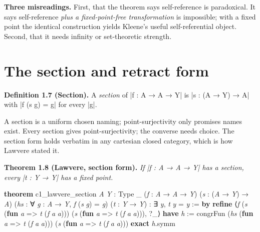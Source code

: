 \documentclass{memoir}
\begin{document}
\textbf{Three misreadings.} First, that the theorem says self-reference is paradoxical.
It says self-reference \emph{plus a fixed-point-free transformation} is impossible;
with a fixed point the identical construction yields Kleene's useful
self-referential object. Second, that it needs infinity or set-theoretic
strength.



\section{The section and retract form}\label{Two--Schemas--of--Impossibility-005F-005F-005F--Machine--Checked--Limits--of--Trustworthy--Machine--Learning-005F-005F-005F--and--Why--They--Tighten--with--Capability----The--Diagonal----The--section--and--retract--form}

\textbf{Definition 1.7 (Section).} A \emph{section} of \LeanVerb|f : A → A → Y| is \LeanVerb|s : (A → Y) → A|
with \LeanVerb|f (s g) = g| for every \LeanVerb|g|.

A section is a uniform chosen naming; point-surjectivity only promises names
exist. Every section gives point-surjectivity; the converse needs choice. The
section form holds verbatim in any cartesian closed category, which is how
Lawvere stated it.

\textbf{Theorem 1.8 (Lawvere, section form).} \emph{If \LeanVerb|f : A → A → Y| has a section, every
\LeanVerb|t : Y → Y| has a fixed point.}

\begin{LeanVerbatim}
\textbf{theorem} c1_lawvere_section \textit{A} \textit{Y} : Type _ (\textit{f} : \textit{A} → \textit{A} → \textit{Y})
    (\textit{s} : (\textit{A} → \textit{Y}) → \textit{A})
    (\textit{hs} : ∀ \textit{g} : \textit{A} → \textit{Y}, \textit{f} (\textit{s} \textit{g}) = \textit{g})
    (\textit{t} : \textit{Y} → \textit{Y}) : ∃ \textit{y}, \textit{t} \textit{y} = \textit{y} := \textbf{by}
  \textbf{refine} ⟨\textit{f} (\textit{s} (\textbf{fun} \textit{a} => \textit{t} (\textit{f} \textit{a} \textit{a})))
    (\textit{s} (\textbf{fun} \textit{a} => \textit{t} (\textit{f} \textit{a} \textit{a}))), ?_⟩
  \textbf{have} \textit{h} := congrFun (\textit{hs} (\textbf{fun} \textit{a} => \textit{t} (\textit{f} \textit{a} \textit{a})))
      (\textit{s} (\textbf{fun} \textit{a} => \textit{t} (\textit{f} \textit{a} \textit{a})))
  \textbf{exact} \textit{h}.symm

\end{LeanVerbatim}
\end{document}
